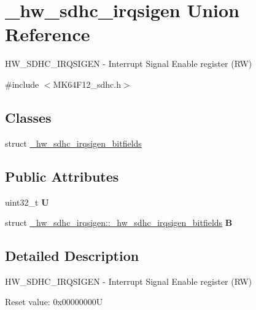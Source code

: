 \hypertarget{union__hw__sdhc__irqsigen}{}\section{\+\_\+hw\+\_\+sdhc\+\_\+irqsigen Union Reference}
\label{union__hw__sdhc__irqsigen}


H\+W\+\_\+\+S\+D\+H\+C\+\_\+\+I\+R\+Q\+S\+I\+G\+EN -\/ Interrupt Signal Enable register (RW)  




{\ttfamily \#include $<$M\+K64\+F12\+\_\+sdhc.\+h$>$}

\subsection*{Classes}
\begin{DoxyCompactItemize}
\item 
struct \hyperlink{struct__hw__sdhc__irqsigen_1_1__hw__sdhc__irqsigen__bitfields}{\+\_\+hw\+\_\+sdhc\+\_\+irqsigen\+\_\+bitfields}
\end{DoxyCompactItemize}
\subsection*{Public Attributes}
\begin{DoxyCompactItemize}
\item 
uint32\+\_\+t {\bfseries U}\hypertarget{union__hw__sdhc__irqsigen_a6a245936daa7376e5efeb36faa98b989}{}\label{union__hw__sdhc__irqsigen_a6a245936daa7376e5efeb36faa98b989}

\item 
struct \hyperlink{struct__hw__sdhc__irqsigen_1_1__hw__sdhc__irqsigen__bitfields}{\+\_\+hw\+\_\+sdhc\+\_\+irqsigen\+::\+\_\+hw\+\_\+sdhc\+\_\+irqsigen\+\_\+bitfields} {\bfseries B}\hypertarget{union__hw__sdhc__irqsigen_af62a9fcb2905509fc3770346dbeb9847}{}\label{union__hw__sdhc__irqsigen_af62a9fcb2905509fc3770346dbeb9847}

\end{DoxyCompactItemize}


\subsection{Detailed Description}
H\+W\+\_\+\+S\+D\+H\+C\+\_\+\+I\+R\+Q\+S\+I\+G\+EN -\/ Interrupt Signal Enable register (RW) 

Reset value\+: 0x00000000U

